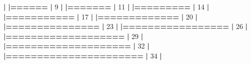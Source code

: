 \documentclass[]{book}
\newenvironment{Shaded}{\begin{snugshade}}{\end{snugshade}}
\newcommand{\DecValTok}[1]{\textcolor[rgb]{0.00,0.00,0.81}{#1}}
\newcommand{\ErrorTok}[1]{\textcolor[rgb]{0.64,0.00,0.00}{\textbf{#1}}}
\newcommand{\NormalTok}[1]{#1}
\newcommand{\OperatorTok}[1]{\textcolor[rgb]{0.81,0.36,0.00}{\textbf{#1}}}
\newcommand{\StringTok}[1]{\textcolor[rgb]{0.31,0.60,0.02}{#1}}
\begin{document}
\begin{Shaded}
\begin{Highlighting}[]
{{{{  \OperatorTok{|}\StringTok{                                                                       }
\StringTok{  }\ErrorTok{|======}\StringTok{                                                           }\ErrorTok{|}\StringTok{   }\DecValTok{9}\NormalTok{%}
  \OperatorTok{|}\StringTok{                                                                       }
\StringTok{  }\ErrorTok{|=======}\StringTok{                                                          }\ErrorTok{|}\StringTok{  }\DecValTok{11}\NormalTok{%}
  \OperatorTok{|}\StringTok{                                                                       }
\StringTok{  }\ErrorTok{|=========}\StringTok{                                                        }\ErrorTok{|}\StringTok{  }\DecValTok{14}\NormalTok{%}
  \OperatorTok{|}\StringTok{                                                                       }
\StringTok{  }\ErrorTok{|===========}\StringTok{                                                      }\ErrorTok{|}\StringTok{  }\DecValTok{17}\NormalTok{%}
  \OperatorTok{|}\StringTok{                                                                       }
\StringTok{  }\ErrorTok{|=============}\StringTok{                                                    }\ErrorTok{|}\StringTok{  }\DecValTok{20}\NormalTok{%}
  \OperatorTok{|}\StringTok{                                                                       }
\StringTok{  }\ErrorTok{|===============}\StringTok{                                                  }\ErrorTok{|}\StringTok{  }\DecValTok{23}\NormalTok{%}
  \OperatorTok{|}\StringTok{                                                                       }
\StringTok{  }\ErrorTok{|=================}\StringTok{                                                }\ErrorTok{|}\StringTok{  }\DecValTok{26}\NormalTok{%}
  \OperatorTok{|}\StringTok{                                                                       }
\StringTok{  }\ErrorTok{|===================}\StringTok{                                              }\ErrorTok{|}\StringTok{  }\DecValTok{29}\NormalTok{%}
  \OperatorTok{|}\StringTok{                                                                       }
\StringTok{  }\ErrorTok{|====================}\StringTok{                                             }\ErrorTok{|}\StringTok{  }\DecValTok{32}\NormalTok{%}
  \OperatorTok{|}\StringTok{                                                                       }
\StringTok{  }\ErrorTok{|======================}\StringTok{                                           }\ErrorTok{|}\StringTok{  }\DecValTok{34}\NormalTok{%}
  \OperatorTok{|}\StringTok{                                                                       }
}}}}}}}}}}}}}}
\end{Highlighting}
\end{Shaded}
\end{document}
